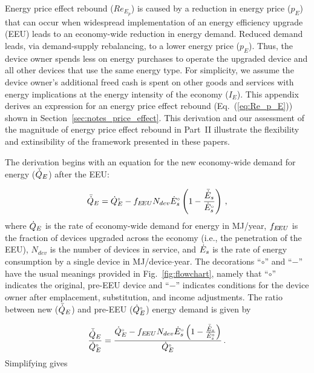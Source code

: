 

Energy price effect rebound ($Re_{E_p}$) is caused by a reduction 
in energy price ($p_E$)
that can occur when widespread implementation 
of an energy efficiency upgrade (EEU)
leads to an economy-wide reduction in energy demand.
Reduced demand leads,
via demand-supply rebalancing, 
to a lower energy price ($p_E$).
Thus, the device owner spends less on energy purchases
to operate the upgraded device
and all other devices that use the same energy type.
For simplicity, 
we assume the device owner's additional freed cash
is spent on other goods and services
with energy implications 
at the energy intensity of the economy ($I_E$).
This appendix derives an expression for an
energy price effect rebound (Eq.~(\ref{eq:Re_p_E}))
shown in Section~\ref{sec:notes_price_effect}.
This derivation and our assessment 
of the magnitude of energy price effect rebound
in Part~II
illustrate the flexibility and extinsibility of the framework
presented in these papers.

The derivation begins with an equation for the new economy-wide 
demand for energy ($\bar{\dot{Q}}_E$) after the EEU:

\begin{equation}
  \bar{\dot{Q}}_E = {}{\dot{Q}}^{\scriptscriptstyle \circ}_E - f_{E\!EU} N_{dev} {}{\dot{E}}^{\scriptscriptstyle \circ}_s \left( 1 - \frac{\bar{\dot{E}}_s}{{}{\dot{E}}^{\scriptscriptstyle \circ}_s} \right) \, ,
\end{equation}
%
where
$\dot{Q}_E$ is the rate of economy-wide demand for energy in MJ/year,
$f_{E\!EU}$ is the fraction of devices upgraded across the economy
(i.e., the penetration of the EEU),
$N_{dev}$ is the number of devices in service, and
$\dot{E}_s$ is the rate of energy consumption by a single device in MJ/device$\cdot$year.
The decorations ``$\circ$'' and ``$-$'' have the usual meanings
provided in Fig.~\ref{fig:flowchart}, namely that
``$\circ$'' indicates the original, pre-EEU device and
``$-$'' indicates conditions for the device owner after
emplacement, substitution, and income
adjustments.
The ratio between
new ($\bar{\dot{Q}}_E$) and
pre-EEU (${}{\dot{Q}}^{\scriptscriptstyle \circ}_E$)
energy demand is given by

\begin{equation}
  \frac{\bar{\dot{Q}}_E}{{}{\dot{Q}}^{\scriptscriptstyle \circ}_E} =
        \frac{{}{\dot{Q}}^{\scriptscriptstyle \circ}_E - f_{E\!EU} N_{dev} {}{\dot{E}}^{\scriptscriptstyle \circ}_s \left( 1 - \frac{\bar{\dot{E}}_s}{{}{\dot{E}}^{\scriptscriptstyle \circ}_s}  \right)}
        {{}{\dot{Q}}^{\scriptscriptstyle \circ}_E} \, .
\end{equation}
%
Simplifying gives

